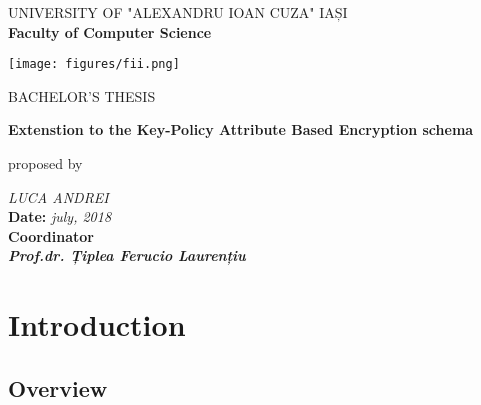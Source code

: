 \documentclass[12pt]{article}
\newcommand\blankpage{%
    \null
    \thispagestyle{empty}%
    \addtocounter{page}{-1}%
    \newpage}
\begin{document}
\begin{titlepage}

\begin{center}

UNIVERSITY OF "ALEXANDRU IOAN CUZA" IAȘI
\\
\textbf{Faculty of Computer Science}
\end{center}

   \vspace{20mm}

\begin{center}
    \texttt{[image: figures/fii.png]}
\end{center}
   \vspace{10mm}
\begin{center}
	\Large{BACHELOR'S THESIS}\\
	
	\vspace{10mm}
	
	\large \textbf{Extenstion to the Key-Policy Attribute Based Encryption schema}\\
	\vspace{5mm}
	
	proposed by
	
	\vspace{5mm}
	\large\textit {LUCA ANDREI}
	\\
	\vspace{20mm}
	\textbf{Date: }\textit{july, 2018}\\
	\vspace{10mm}
	\textbf{Coordinator}\\
	\textbf{\textit{Prof.dr. Țiplea Ferucio Laurențiu}}
	\vspace{30mm}
\end{center}
\end{titlepage} 

\afterpage{\blankpage}

\onecolumn
\tableofcontents
\twocolumn

\onecolumn

\section{Introduction}

\subsection{Overview}
\end{document}
